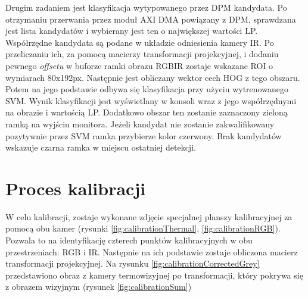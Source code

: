Drugim zadaniem jest klasyfikacja wytypowanego przez DPM kandydata. Po otrzymaniu przerwania przez moduł AXI DMA powiązany z DPM, sprawdzana jest lista kandydatów i wybierany jest ten o największej wartości LP. Współrzędne kandydata są podane w układzie odniesienia kamery IR. Po przeliczaniu ich, za pomocą macierzy transformacji projekcyjnej, i dodaniu pewnego \textit{offsetu} w buforze ramki obrazu RGBIR zostaje wskazane ROI o wymiarach 80x192px. Następnie jest obliczany wektor cech HOG z tego obszaru. Potem na jego podstawie odbywa się klasyfikacja przy użyciu wytrenowanego SVM. Wynik klasyfikacji jest wyświetlany w konsoli wraz z jego współrzędnymi na obrazie i wartością LP. Dodatkowo obszar ten zostanie zaznaczony zieloną ramką na wyjściu monitora. Jeżeli kandydat nie zostanie zakwalifikowany pozytywnie przez SVM ramka przybierze kolor czerwony. Brak kandydatów wskazuje czarna ramka w miejscu ostatniej detekcji.
\section{Proces kalibracji}
W celu kalibracji, zostaje wykonane zdjęcie specjalnej planszy kalibracyjnej za pomocą obu kamer (rysunki \ref{fig:calibrationThermal}, \ref{fig:calibrationRGB}). Pozwala to na identyfikację czterech punktów kalibracyjnych w obu przestrzeniach: RGB i IR. Następnie na ich podstawie zostaje obliczona macierz transformacji projekcyjnej. Na rysunku \ref{fig:calibrationCorrectedGrey} przedstawiono obraz z kamery termowizyjnej po transformacji, który pokrywa się z obrazem wizyjnym (rysunek \ref{fig:calibrationSum})

